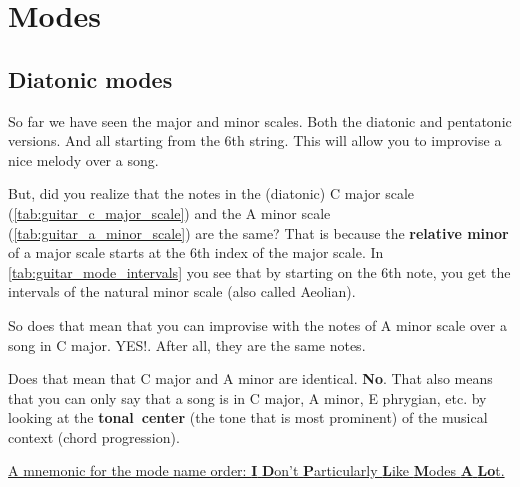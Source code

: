 \section{Modes}

\subsection{Diatonic modes}

So far we have seen the major and minor scales. Both the diatonic and pentatonic versions. And all starting from the 6th string. This will allow you to improvise a nice melody over a song.

But, did you realize that the notes in the (diatonic) C major scale (\autoref{tab:guitar_c_major_scale}) and the A minor scale (\autoref{tab:guitar_a_minor_scale}) are the same? That is because the \textbf{relative minor} of a major scale starts at the 6th index of the major scale. In \autoref{tab:guitar_mode_intervals} you see that by starting on the 6th note, you get the intervals of the natural minor scale (also called \textnormal{A}eolian).

So d\textnormal{o}es that mean that you can improvise with the notes of A minor scale over a song in C major. YES!. After all, they are the same notes.

D\textnormal{o}es that mean that C major and A minor are identical. \textbf{No}. That also means that you can only say that a song is in C major, A minor, E phrygian, etc. by looking at the \mbox{\textbf{tonal center}} (the tone that is most prominent) of the musical context (chord progression). 

\underline{A mnemonic for the mode name order: \textbf{I} \textbf{D}on't \textbf{P}articularly \textbf{L}ike \textbf{M}odes \textbf{A} \textbf{Lo}t.}

